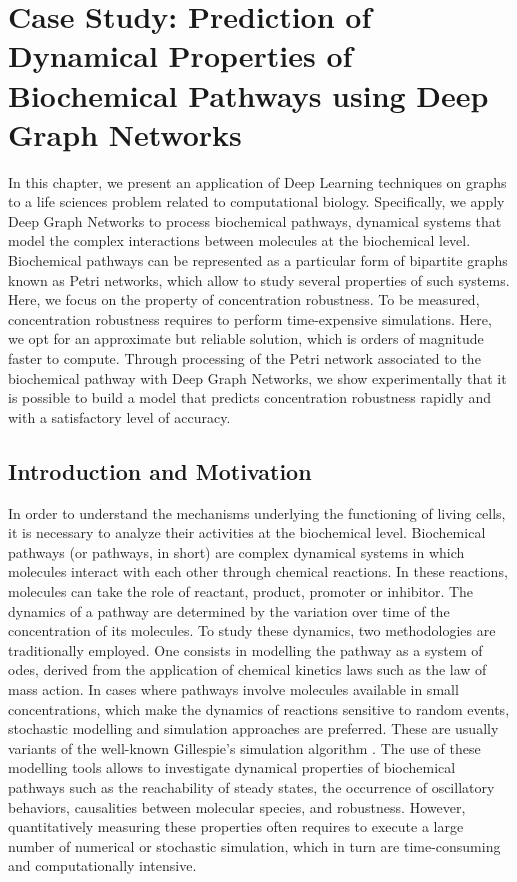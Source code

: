 \chapter{Case Study: Prediction of Dynamical Properties of Biochemical Pathways using Deep Graph Networks}\label{ch:prediction-biochemical-dgn}

In this chapter, we present an application of Deep Learning techniques on graphs to a life sciences problem related to computational biology. Specifically, we apply Deep Graph Networks to process biochemical pathways, \ie dynamical systems that model the complex interactions between molecules at the biochemical level. Biochemical pathways can be represented as a particular form of bipartite graphs known as Petri networks, which allow to study several properties of such systems. Here, we focus on the property of concentration robustness. To be measured, concentration robustness requires to perform time-expensive simulations. Here, we opt for an approximate but reliable solution, which is orders of magnitude faster to compute. Through processing of the Petri network associated to the biochemical pathway with Deep Graph Networks, we show experimentally that it is possible to build a model that predicts concentration robustness rapidly and with a satisfactory level of accuracy.

\section{Introduction and Motivation}
In order to understand the mechanisms underlying the functioning of living cells, it is necessary to analyze their activities at the biochemical level. Biochemical pathways (or pathways, in short) are complex dynamical systems in which molecules interact with each other through chemical reactions. In these reactions, molecules can take the role of reactant, product, promoter or inhibitor. The dynamics of a pathway are determined by the variation over time of the concentration of its molecules. To study these dynamics, two methodologies are traditionally employed. One consists in modelling the pathway as a system of \glspl{ode}, derived from the application of chemical kinetics laws such as the law of mass action. In cases where pathways involve molecules available in small concentrations, which make the dynamics of reactions sensitive to random events, stochastic modelling and simulation approaches are preferred. These are usually variants of the well-known Gillespie's simulation algorithm \cite{?}. The use of these modelling tools allows to investigate dynamical properties of biochemical pathways such as the reachability of steady states, the occurrence of oscillatory behaviors, causalities between molecular species, and robustness. However, quantitatively measuring these properties often requires to execute a large number of numerical or stochastic simulation, which in turn are time-consuming and computationally intensive.

